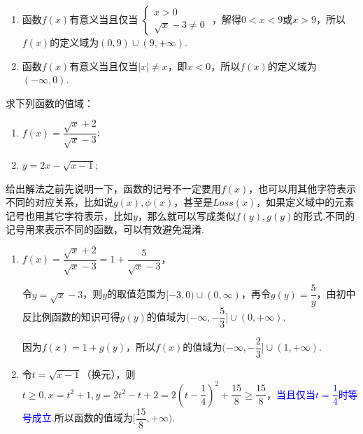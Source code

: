 \documentclass[lang=cn,math=cm,chinesefont=nofont,11pt,scheme=chinese,twocol]{elegantbook}
\begin{document}
\begin{solution}
  \begin{enumerate}
    \item 函数$f(x)$有意义当且仅当
     $\begin{cases}
        x>0
        \\\sqrt{x}-3\neq 0
      \end{cases}$
    ，解得$0<x<9$或$x>9$，所以$f(x)$的定义域为$(0,9)\cup (9,+\infty)$.

    \item 函数$f(x)$有意义当且仅当$\left| x \right|\neq x$，即$x<0$，所以$f(x)$的定义域为$(-\infty,0).$
  \end{enumerate}
\end{solution}

\begin{spacing}{2.0}
  \begin{example}
    求下列函数的值域：
  \end{example}
  
  \begin{enumerate}
    \item $f(x)=\dfrac{\sqrt{x}+2}{\sqrt{x}-3}$;
    \item $y=2x-\sqrt{x-1}$;
  \end{enumerate}
\end{spacing}

给出解法之前先说明一下，函数的记号不一定要用$f(x)$，也可以用其他字符表示不同的对应关系，比如说$g(x),\phi (x)$，甚至是$Loss(x)$，如果定义域中的元素记号也用其它字符表示，比如$y$，那么就可以写成类似$f(y),g(y)$的形式.不同的记号用来表示不同的函数，可以有效避免混淆.

\begin{solution}
  \begin{enumerate}
    \item $f(x)=\dfrac{\sqrt{x}+2}{\sqrt{x}-3}=1+\dfrac{5}{\sqrt{x}-3}$，
    
    令$y=\sqrt{x}-3$，则$y$的取值范围为$[-3,0)\cup (0,\infty)$，再令$g(y)=\dfrac{5}{y}$，由初中反比例函数的知识可得$g(y)$的值域为$(-\infty,-\dfrac{5}{3}]\cup (0,+\infty)$.

    因为$f(x)=1+g(y)$，所以$f(x)$的值域为$(-\infty,-\dfrac{2}{3}]\cup (1,+\infty)$.

    \item 令$t=\sqrt{x-1}$（换元），则$t\geqslant 0,x=t^2+1,y=2t^2-t+2=2(t-\dfrac{1}{4})^2+\dfrac{15}{8}\geqslant\dfrac{15}{8}$，\textcolor{blue}{当且仅当$t=\dfrac{1}{4}$时等号成立}.所以函数的值域为$[\dfrac{15}{8},+\infty).$
  \end{enumerate}
\end{solution}
\end{document}
